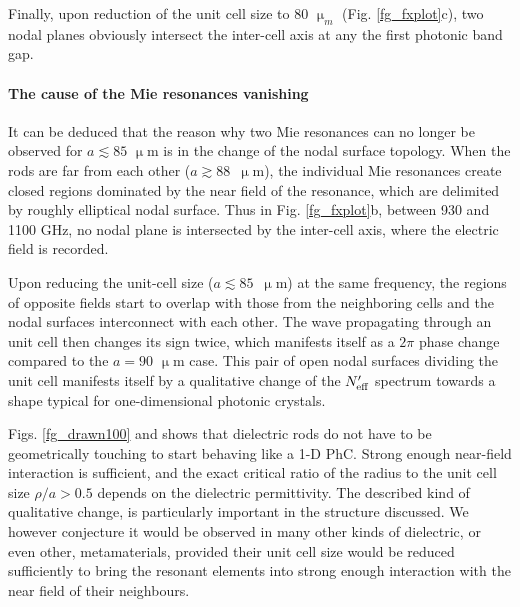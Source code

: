 Finally, upon reduction of the unit cell size to $80$ $\upmu_m$ (Fig. \ref{fg_fxplot}c), two nodal planes obviously intersect the inter-cell axis at any the first photonic band gap. %

\paragraph{The cause of the Mie resonances vanishing}%
It can be deduced that the reason why two Mie resonances can no longer be observed for $a\lesssim 85$ $\upmu$m is in the change of the nodal surface topology. When the rods are far from each other ($a\gtrsim 88$~$\upmu$m), the individual Mie resonances create closed regions dominated by the near field of the resonance, which are delimited by roughly elliptical nodal surface. Thus in Fig.  \ref{fg_fxplot}b, between 930 and 1100 GHz,  %
no nodal plane is intersected by the inter-cell axis, where the electric field is recorded.

Upon reducing the unit-cell size ($a\lesssim 85$~$\upmu$m) at the same frequency, the regions of opposite fields start to overlap with those from the neighboring cells and the nodal surfaces interconnect with each other. The wave propagating through an unit cell then changes its sign twice, which manifests itself as a $2\pi$ phase change compared to the $a=90$ $\upmu$m case. 
This pair of open nodal surfaces dividing the unit cell manifests itself by a qualitative change of the $N_{\text{eff} }'$ spectrum towards a shape typical for one-dimensional photonic crystals.

Figs. \ref{fg_drawn100} and  shows that dielectric rods do not have to be geometrically touching to start behaving like a 1-D PhC. Strong enough near-field interaction is sufficient, and the exact critical ratio of the radius to the unit cell size $\rho/a > 0.5$ depends on the dielectric permittivity. The described kind of qualitative change, is particularly important in the structure discussed. We however conjecture it would be observed in many other kinds of dielectric, or even other, metamaterials, provided their unit cell size would be reduced sufficiently to bring the resonant elements into strong enough interaction with the near field of their neighbours.



